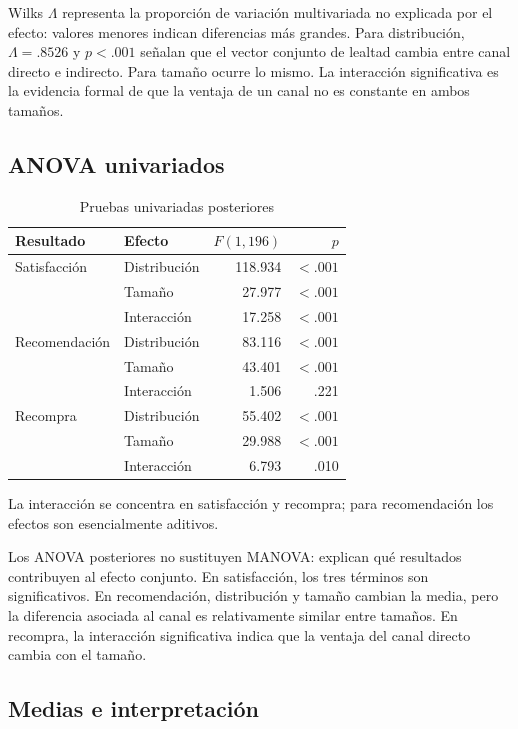 \documentclass[11pt,letterpaper]{article}
\begin{document}
Wilks $\Lambda$ representa la proporción de variación multivariada no explicada por el efecto: valores menores indican diferencias más grandes. Para distribución, $\Lambda=.8526$ y $p<.001$ señalan que el vector conjunto de lealtad cambia entre canal directo e indirecto. Para tamaño ocurre lo mismo. La interacción significativa es la evidencia formal de que la ventaja de un canal no es constante en ambos tamaños.

\subsection{ANOVA univariados}

\begin{table}[H]
\centering
\caption{Pruebas univariadas posteriores}
\begin{tabular}{llrr}
\toprule
Resultado & Efecto & $F(1,196)$ & $p$\\
\midrule
Satisfacción & Distribución & 118.934 & $<.001$\\
 & Tamaño & 27.977 & $<.001$\\
 & Interacción & 17.258 & $<.001$\\
\addlinespace
Recomendación & Distribución & 83.116 & $<.001$\\
 & Tamaño & 43.401 & $<.001$\\
 & Interacción & 1.506 & .221\\
\addlinespace
Recompra & Distribución & 55.402 & $<.001$\\
 & Tamaño & 29.988 & $<.001$\\
 & Interacción & 6.793 & .010\\
\bottomrule
\end{tabular}
\end{table}

La interacción se concentra en satisfacción y recompra; para recomendación los efectos son esencialmente aditivos.

Los ANOVA posteriores no sustituyen MANOVA: explican qué resultados contribuyen al efecto conjunto. En satisfacción, los tres términos son significativos. En recomendación, distribución y tamaño cambian la media, pero la diferencia asociada al canal es relativamente similar entre tamaños. En recompra, la interacción significativa indica que la ventaja del canal directo cambia con el tamaño.

\subsection{Medias e interpretación}
\end{document}
